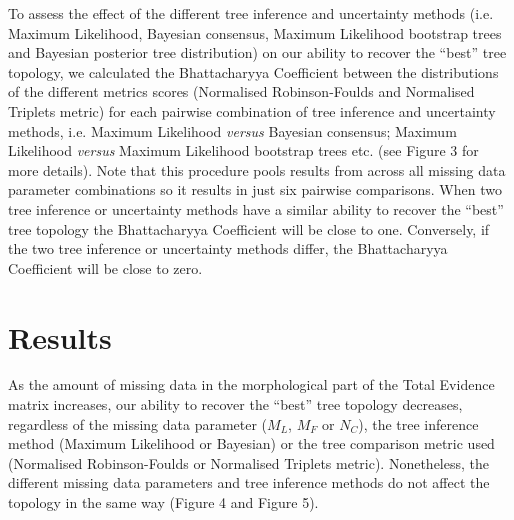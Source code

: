\documentclass[12pt,letterpaper]{article}
\begin{document}
To assess the effect of the different tree inference and uncertainty methods (i.e. Maximum Likelihood, Bayesian consensus, Maximum Likelihood bootstrap trees and Bayesian posterior tree distribution) on our ability to recover the ``best'' tree topology, we calculated the Bhattacharyya Coefficient between the distributions of the different metrics scores (Normalised Robinson-Foulds and Normalised Triplets metric) for each pairwise combination of tree inference and uncertainty methods, i.e. Maximum Likelihood \textit{versus} Bayesian consensus; Maximum Likelihood \textit{versus} Maximum Likelihood bootstrap trees etc. (see Figure 3 for more details).
Note that this procedure pools results from across all missing data parameter combinations so it results in just six pairwise comparisons.
When two tree inference or uncertainty methods have a similar ability to recover the ``best'' tree topology the Bhattacharyya Coefficient will be close to one.
Conversely, if the two tree inference or uncertainty methods differ, the Bhattacharyya Coefficient will be close to zero.


%
%

\section{Results}
As the amount of missing data in the morphological part of the Total Evidence matrix increases, our ability to recover the ``best'' tree topology decreases, regardless of the missing data parameter ($M_{L}$, $M_{F}$ or $N_{C}$), the tree inference method (Maximum Likelihood or Bayesian) or the tree comparison metric used (Normalised Robinson-Foulds or Normalised Triplets metric).
Nonetheless, the different missing data parameters and tree inference methods do not affect the topology in the same way (Figure 4 and Figure 5).
\end{document}
